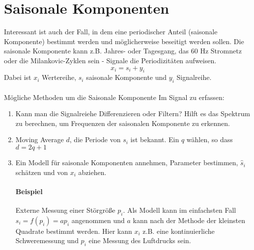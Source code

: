 \section{Saisonale Komponenten}
Interessant ist auch der Fall, in dem eine periodischer Anteil (saisonale Komponente) bestimmt werden und möglicherweise beseitigt werden sollen. Die saisonale Komponente kann z.B. Jahres- oder Tagesgang, das 60 Hz Stromnetz oder die Milankovic-Zyklen sein - Signale die Periodizitäten aufweisen.
\[
x_i=s_i + y_i
\]
Dabei ist $x_i$ Wertereihe, $s_i$ saisonale Komponente und $y_i$ Signalreihe.\\\\
Mögliche Methoden um die Saisonale Komponente Im Signal zu erfassen:
\begin{enumerate}
\item Kann man die Signalreiehe Differenzieren oder Filtern? Hilft es das Spektrum zu berechnen, um Frequenzen der saisonalen Komponente zu erkennen.

\item Moving Average $d$, die Periode von $s_i$ ist bekannt. Ein $q$ wählen, so dass $d=2q+1$\\

\item Ein Modell für saisonale Komponenten annehmen, Parameter bestimmen, $\hat s_i$ schätzen und von $x_i$ abziehen.

\paragraph{Beispiel} Externe Messung einer Störgröße $p_i$. Als Modell kann im einfachsten Fall $s_i=f(p_i) = ap_i$ angenommen und $a$ kann nach der Methode der kleinsten Quadrate bestimmt werden. Hier kann $x_i$ z.B. eine kontinuierliche Schweremessung und $p_i$ eine Messung des Luftdrucks sein. 


\end{enumerate}
